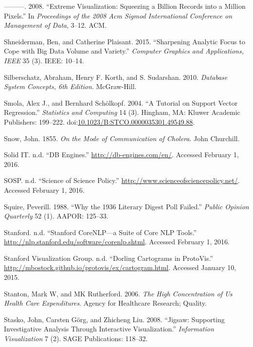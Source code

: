 \documentclass[]{krantz}
\begin{document}
\hypertarget{ref-shneiderman2008extreme}{}
---------. 2008. ``Extreme Visualization: Squeezing a Billion Records
into a Million Pixels.'' In \emph{Proceedings of the 2008 Acm Sigmod
International Conference on Management of Data}, 3--12. ACM.

\hypertarget{ref-shneiderman2015sharpening}{}
Shneiderman, Ben, and Catherine Plaisant. 2015. ``Sharpening Analytic
Focus to Cope with Big Data Volume and Variety.'' \emph{Computer
Graphics and Applications, IEEE} 35 (3). IEEE: 10--14.

\hypertarget{ref-silberschatz2010database}{}
Silberschatz, Abraham, Henry F. Korth, and S. Sudarshan. 2010.
\emph{Database System Concepts, 6th Edition}. McGraw-Hill.

\hypertarget{ref-SmolaRegression04}{}
Smola, Alex J., and Bernhard Schölkopf. 2004. ``A Tutorial on Support
Vector Regression.'' \emph{Statistics and Computing} 14 (3). Hingham,
MA: Kluwer Academic Publishers: 199--222.
doi:\href{https://doi.org/10.1023/B:STCO.0000035301.49549.88}{10.1023/B:STCO.0000035301.49549.88}.

\hypertarget{ref-snow1855mode}{}
Snow, John. 1855. \emph{On the Mode of Communication of Cholera}. John
Churchill.

\hypertarget{ref-DBengines}{}
Solid IT. n.d. ``DB Engines.'' \url{http://db-engines.com/en/}. Accessed
February 1, 2016.

\hypertarget{ref-SOSP}{}
SOSP. n.d. ``Science of Science Policy.''
\url{http://www.scienceofsciencepolicy.net/}. Accessed February 1, 2016.

\hypertarget{ref-squire19881936}{}
Squire, Peverill. 1988. ``Why the 1936 Literary Digest Poll Failed.''
\emph{Public Opinion Quarterly} 52 (1). AAPOR: 125--33.

\hypertarget{ref-corenlp}{}
Stanford. n.d. ``Stanford CoreNLP---a Suite of Core NLP Tools.''
\url{http://nlp.stanford.edu/software/corenlp.shtml}. Accessed February
1, 2016.

\hypertarget{ref-ProtoVis2015}{}
Stanford Visualization Group. n.d. ``Dorling Cartograms in ProtoVis.''
\url{http://mbostock.github.io/protovis/ex/cartogram.html}. Accessed
January 10, 2015.

\hypertarget{ref-stanton2006high}{}
Stanton, Mark W, and MK Rutherford. 2006. \emph{The High Concentration
of Us Health Care Expenditures}. Agency for Healthcare Research;
Quality.

\hypertarget{ref-stasko2008jigsaw}{}
Stasko, John, Carsten Görg, and Zhicheng Liu. 2008. ``Jigsaw: Supporting
Investigative Analysis Through Interactive Visualization.''
\emph{Information Visualization} 7 (2). SAGE Publications: 118--32.
\end{document}
